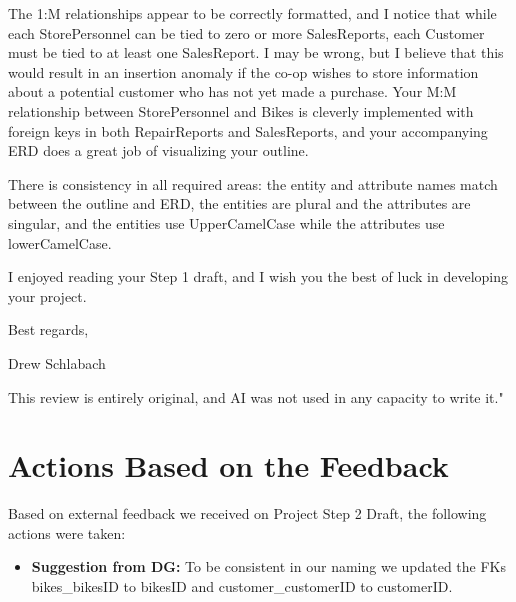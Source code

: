 \documentclass{article}
\begin{document}
\begin{tcolorbox}[colback=secondarycolor, colframe=primarycolor, title=\textbf{Step 1: Peer Review 3 - Drew Schlabach}]
\vspace{0.2cm}

The 1:M relationships appear to be correctly formatted, and I notice that while each StorePersonnel can be tied to zero or more SalesReports, each Customer must be tied to at least one SalesReport. I may be wrong, but I believe that this would result in an insertion anomaly if the co-op wishes to store information about a potential customer who has not yet made a purchase. Your M:M relationship between StorePersonnel and Bikes is cleverly implemented with foreign keys in both RepairReports and SalesReports, and your accompanying ERD does a great job of visualizing your outline. 

\vspace{0.2cm}

There is consistency in all required areas: the entity and attribute names match between the outline and ERD, the entities are plural and the attributes are singular, and the entities use UpperCamelCase while the attributes use lowerCamelCase. 

\vspace{0.2cm}

I enjoyed reading your Step 1 draft, and I wish you the best of luck in developing your project.

\vspace{0.2cm}

Best regards,

\vspace{0.2cm}

Drew Schlabach

\vspace{0.2cm}

This review is entirely original, and AI was not used in any capacity to write it."
\vspace{0.2cm}
\end{tcolorbox}

\section{Actions Based on the Feedback}

\vspace{0.5cm}
\begin{tcolorbox}[colback=secondarycolor, colframe=primarycolor, arc=5mm, title=\textbf{Step 2 --> Step 3 }]
Based on external feedback we received on Project Step 2 Draft, the following actions were taken:
\vspace{0.2cm}
\begin{itemize}
  \item \textbf{Suggestion from DG:} To be consistent in our naming we updated the FKs bikes\_bikesID to bikesID and customer\_customerID to customerID.
 \end{itemize}
\vspace{0.2cm}
\end{tcolorbox}
\end{document}

